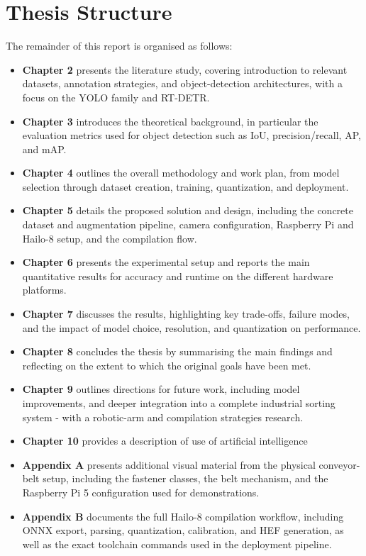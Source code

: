 \documentclass[12pt,a4paper]{report}
\begin{document}
\section{Thesis Structure}
The remainder of this report is organised as follows:
\begin{itemize}
    \item \textbf{Chapter 2} presents the literature study, covering introduction to relevant datasets, annotation strategies,
          and object-detection architectures, with a focus on the YOLO family and RT-DETR.
    \item \textbf{Chapter 3} introduces the theoretical background, in particular the evaluation metrics used
          for object detection such as IoU, precision/recall, AP, and mAP.
    \item \textbf{Chapter 4} outlines the overall methodology and work plan, from model selection through
          dataset creation, training, quantization, and deployment.
    \item \textbf{Chapter 5} details the proposed solution and design, including the concrete dataset and
          augmentation pipeline, camera configuration, Raspberry Pi and Hailo-8 setup, and the compilation flow.
    \item \textbf{Chapter 6} presents the experimental setup and reports the main quantitative results for
          accuracy and runtime on the different hardware platforms.
    \item \textbf{Chapter 7} discusses the results, highlighting key trade-offs, failure modes, and the impact
          of model choice, resolution, and quantization on performance.
    \item \textbf{Chapter 8} concludes the thesis by summarising the main findings and reflecting on the extent
          to which the original goals have been met.
    \item \textbf{Chapter 9} outlines directions for future work, including
          model improvements, and deeper integration into a complete industrial sorting system - with
          a robotic-arm and compilation strategies research.
    \item \textbf{Chapter 10} provides a description of use of artificial intelligence
    \item \textbf{Appendix A} presents additional visual material from the physical conveyor-belt setup,
      including the fastener classes, the belt mechanism, and the Raspberry Pi 5 configuration used
      for demonstrations.
    \item \textbf{Appendix B} documents the full Hailo-8 compilation workflow, including ONNX export,
          parsing, quantization, calibration, and HEF generation, as well as the exact toolchain commands
          used in the deployment pipeline.

\end{itemize}
\end{document}

